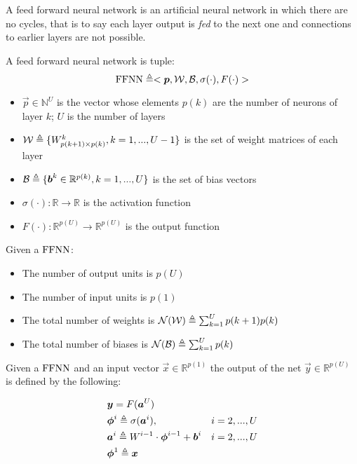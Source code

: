 
A feed forward neural network is an artificial neural network in which there are no cycles, that is to say each layer output is \textit{fed} to the 
next one and connections to earlier layers are not possible. 


\begin{defn}
\label{def_ffnn}
A feed forward neural network is tuple:
$$\mathrm{FFNN}\triangleq<\boldsymbol{p},\mathcal{W},\mathcal{B},\sigma(\cdot),F(\cdot)>$$
\begin{itemize}
 \item $\vec{p} \in \mathbb{N}^U$ is the vector whose elements $p(k)$ are the number of neurons of layer $k$; $U$ is the number of layers
 \item $\mathcal{W} \triangleq \{W^k_{p(k+1) \times p(k)}, k=1,...,U-1 \}$ is the set of weight matrices of each layer
 \item $\mathcal{B} \triangleq \{\boldsymbol{b}^k \in \mathbb{R}^{p(k)}, k=1,...,U \} $ is the set of bias vectors
 \item $\sigma(\cdot): \mathbb{R}\rightarrow \mathbb{R}$ is the activation function
 \item $F(\cdot): \mathbb{R}^{p(U)}\rightarrow \mathbb{R}^{p(U)}$ is the output function
\end{itemize}
\end{defn}

\begin{remark}{}
Given a $\mathrm{FFNN}$:
\begin{itemize}
 \item The number of output units is $p(U)$
 \item The number of input units is $p(1)$
 \item The total number of weights is $\mathcal{N}(\mathcal{W}) \triangleq \sum_{k=1}^U p(k+1)p(k)$
 \item The total number of biases is $\mathcal{N}(\mathcal{B}) \triangleq \sum_{k=1}^{U} p(k)$
\end{itemize}
\end{remark}

\begin{defn}
Given a $\mathrm{FFNN}$ and an input vector $\vec{x} \in \mathbb{R}^{p(1)}$ the output of the net $\vec{y} \in \mathbb{R}^{p(U)}$  is defined by the following:

\begin{align}
&\boldsymbol{y}=F(\boldsymbol{a}^{U}) &\\
&\boldsymbol{\phi}^{i} \triangleq \sigma(\boldsymbol{a}^{i}), & i=2,...,U\\
&\boldsymbol{a}^{i} \triangleq W^{i-1} \cdot \boldsymbol{\phi}^{i-1} +\boldsymbol{b}^i  & i=2,...,U\\
&\boldsymbol{\phi}^{1} \triangleq \boldsymbol{x} &
\end{align}
\end{defn}


